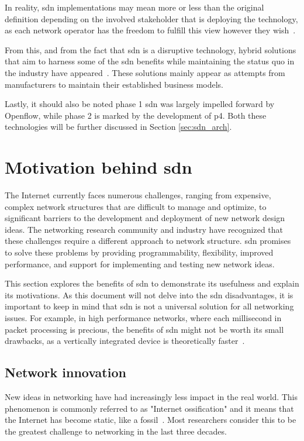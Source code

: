 In reality, \gls{sdn} implementations may mean more or less than the original definition depending on the involved stakeholder that is deploying the technology, as each network operator has the freedom to fulfill this view however they wish~\cite{peterson_software-defined_2021}. 

From this, and from the fact that \gls{sdn} is a disruptive technology, hybrid solutions that aim to harness some of the \gls{sdn} benefits while maintaining the status quo in the industry have appeared~\cite{peterson_software-defined_2021}. These solutions mainly appear as attempts from manufacturers to maintain their established business models. 

Lastly, it should also be noted phase 1 \gls{sdn} was largely impelled forward by Openflow, while phase 2 is marked by the development of \gls{p4}. Both these technologies will be further discussed in Section \ref{sec:sdn_arch}.


\section[Motivation behind SDN]{Motivation behind \gls{sdn}}

The Internet currently faces numerous challenges, ranging from expensive, complex network structures that are difficult to manage and optimize, to significant barriers to the development and deployment of new network design ideas. The networking research community and industry have recognized that these challenges require a different approach to network structure. \gls{sdn} promises to solve these problems by providing programmability, flexibility, improved performance, and support for implementing and testing new network ideas.

This section explores the benefits of \gls{sdn} to demonstrate its usefulness and explain its motivations. As this document will not delve into the \gls{sdn} disadvantages, it is important to keep in mind that \gls{sdn} is not a universal solution for all networking issues. For example, in high performance networks, where each millisecond in packet processing is precious, the benefits of \gls{sdn} might not be worth its small drawbacks, as a vertically integrated device is theoretically faster~\cite{nunes_survey_2014}. 

\subsection{Network innovation}
New ideas in networking have had increasingly less impact in the real world. This phenomenon is commonly referred to as "Internet ossification" and it means that the Internet has become static, like a fossil~\cite{nunes_survey_2014}. Most researchers consider this to be the greatest challenge to networking in the last three decades.

